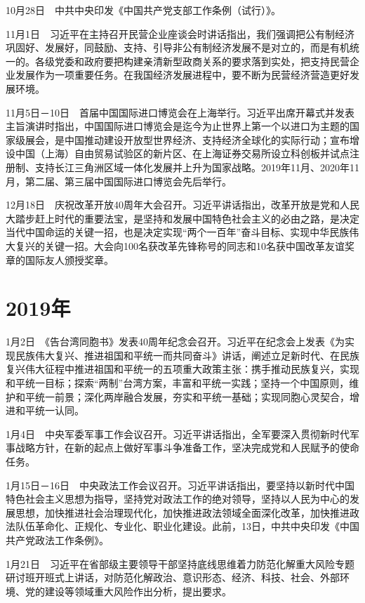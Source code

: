 \documentclass[10pt,a4paper,twocolumn]{book}
\begin{document}
10月28日　中共中央印发《中国共产党支部工作条例（试行）》。

11月1日　习近平在主持召开民营企业座谈会时讲话指出，我们强调把公有制经济巩固好、发展好，同鼓励、支持、引导非公有制经济发展不是对立的，而是有机统一的。各级党委和政府要把构建亲清新型政商关系的要求落到实处，把支持民营企业发展作为一项重要任务。在我国经济发展进程中，要不断为民营经济营造更好发展环境。

11月5日－10日　首届中国国际进口博览会在上海举行。习近平出席开幕式并发表主旨演讲时指出，中国国际进口博览会是迄今为止世界上第一个以进口为主题的国家级展会，是中国推动建设开放型世界经济、支持经济全球化的实际行动；宣布增设中国（上海）自由贸易试验区的新片区、在上海证券交易所设立科创板并试点注册制、支持长江三角洲区域一体化发展并上升为国家战略。2019年11月、2020年11月，第二届、第三届中国国际进口博览会先后举行。

12月18日　庆祝改革开放40周年大会召开。习近平讲话指出，改革开放是党和人民大踏步赶上时代的重要法宝，是坚持和发展中国特色社会主义的必由之路，是决定当代中国命运的关键一招，也是决定实现“两个一百年”奋斗目标、实现中华民族伟大复兴的关键一招。大会向100名获改革先锋称号的同志和10名获中国改革友谊奖章的国际友人颁授奖章。

\section{2019年}

1月2日　《告台湾同胞书》发表40周年纪念会召开。习近平在纪念会上发表《为实现民族伟大复兴、推进祖国和平统一而共同奋斗》讲话，阐述立足新时代、在民族复兴伟大征程中推进祖国和平统一的五项重大政策主张：携手推动民族复兴，实现和平统一目标；探索“两制”台湾方案，丰富和平统一实践；坚持一个中国原则，维护和平统一前景；深化两岸融合发展，夯实和平统一基础；实现同胞心灵契合，增进和平统一认同。

1月4日　中央军委军事工作会议召开。习近平讲话指出，全军要深入贯彻新时代军事战略方针，在新的起点上做好军事斗争准备工作，坚决完成党和人民赋予的使命任务。

1月15日－16日　中央政法工作会议召开。习近平讲话指出，要坚持以新时代中国特色社会主义思想为指导，坚持党对政法工作的绝对领导，坚持以人民为中心的发展思想，加快推进社会治理现代化，加快推进政法领域全面深化改革，加快推进政法队伍革命化、正规化、专业化、职业化建设。此前，13日，中共中央印发《中国共产党政法工作条例》。

1月21日　习近平在省部级主要领导干部坚持底线思维着力防范化解重大风险专题研讨班开班式上讲话，对防范化解政治、意识形态、经济、科技、社会、外部环境、党的建设等领域重大风险作出分析，提出要求。
\end{document}
